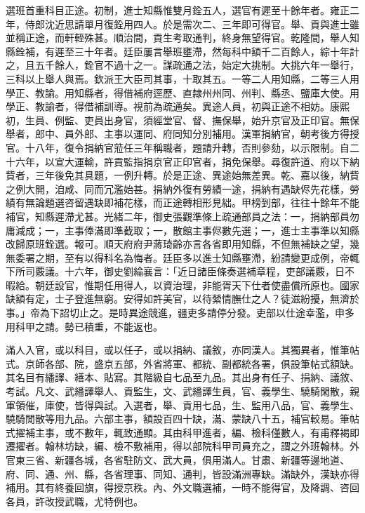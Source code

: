 \begin{pinyinscope}
選班首重科目正途。初制，進士知縣惟雙月銓五人，選官有遲至十餘年者。雍正二年，侍郎沈近思請單月復銓用四人。於是需次二、三年即可得官。舉、貢與進士雖並稱正途，而軒輊殊甚。順治間，貢生考取通判，終身無望得官。乾隆間，舉人知縣銓補，有遲至三十年者。廷臣屢言舉班壅滯，然每科中額千二百餘人，綜十年計之，且五千餘人，銓官不過十之一。謀疏通之法，始定大挑制。大挑六年一舉行，三科以上舉人與焉。欽派王大臣司其事，十取其五。一等二人用知縣，二等三人用學正、教諭。用知縣者，得借補府逕歷、直隸州州同、州判、縣丞、鹽庫大使。用學正、教諭者，得借補訓導。視前為疏通矣。異途人員，初與正途不相妨。康熙初，生員、例監、吏員出身官，須經堂官、督、撫保舉，始升京官及正印官。無保舉者，郎中、員外郎、主事以運同、府同知分別補用。漢軍捐納官，朝考後方得授官。十八年，復令捐納官蒞任三年稱職者，題請升轉，否則參劾，以示限制。自二十六年，以宣大運輸，許貢監指捐京官正印官者，捐免保舉。尋復許道、府以下納貲者，三年後免其具題，一例升轉。於是正途、異途始無差異。乾、嘉以後，納貲之例大開，洎咸、同而冗濫始甚。捐納外復有勞績一途，捐納有遇缺侭先花樣，勞績有無論題選咨留遇缺即補花樣，而正途轉相形見絀。甲榜到部，往往十餘年不能補官，知縣遲滯尤甚。光緒二年，御史張觀準條上疏通部員之法：一，捐納部員勿庸減成；一，主事俸滿即準截取；一，散館主事侭數先選；一，進士主事準以知縣改歸原班銓選。報可。順天府府尹蔣琦齡亦言各省即用知縣，不但無補缺之望，幾無委署之期，至有以得科名為悔者。廷臣多以進士知縣壅滯，紛請變更成例，帝輒下所司覈議。十六年，御史劉綸襄言：「近日諸臣條奏選補章程，吏部議覈，日不暇給。朝廷設官，惟期任用得人，以資治理，非能胥天下仕者使盡償所原也。國家缺額有定，士子登進無窮。安得如許美官，以待縈情膴仕之人？徒滋紛擾，無濟於事。」帝為下詔切止之。是時異途競進，疆吏多請停分發。吏部以仕途幸濫，申多用科甲之請。勢已積重，不能返也。

滿人入官，或以科目，或以任子，或以捐納、議敘，亦同漢人。其獨異者，惟筆帖式。京師各部、院，盛京五部，外省將軍、都統、副都統各署，俱設筆帖式額缺。其名目有繙譯、繕本、貼寫。其階級自七品至九品。其出身有任子、捐納、議敘、考試。凡文、武繙譯舉人、貢監生，文、武繙譯生員，官、義學生、驍騎閑散，親軍領催，庫使，皆得與試。入選者，舉、貢用七品，生、監用八品，官、義學生、驍騎閒散等用九品。六部主事，額設百四十缺，滿、蒙缺八十五，補官較易。筆帖式擢補主事，或不數年，輒致通顯。其由科甲進者，編、檢科僅數人，有甫釋褐即遷擢者。翰林坊缺，編、檢不敷補用，得以部院科甲司員充之，謂之外班翰林。外官東三省、新疆各城，各省駐防文、武大員，俱用滿人。甘肅、新疆等邊地道、府、同、通、州、縣，各省理事、同知、通判，皆設滿洲專缺。滿缺外，漢缺亦得補用。其有終養回旗，得授京秩。內、外文職選補，一時不能得官，及降調、咨回各員，許改授武職，尤特例也。


\end{pinyinscope}
